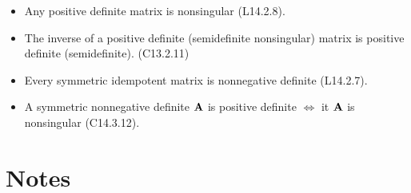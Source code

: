 \documentclass[a4paper, oneside]{book}
\begin{document}
\begin{itemize}
\begin{itemize}
	\item Any positive definite matrix is nonsingular (L14.2.8).
	\item The inverse of a positive definite (semidefinite nonsingular) matrix is positive definite (semidefinite). (C13.2.11)
	\item Every symmetric idempotent matrix is nonnegative definite (L14.2.7).
	\item A symmetric nonnegative definite $\mathbf{A}$ is positive definite $\iff$ it $\mathbf{A}$ is nonsingular (C14.3.12).
	\end{itemize}
\end{itemize}








\section{Notes}
\end{document}

